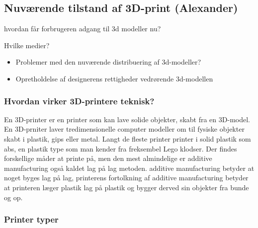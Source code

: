 \subsection{Nuværende tilstand af 3D-print (Alexander)} %
\label{sub:nuv_rende_tilstand_af_3d_print_alexander_}

hvordan får forbrugeren adgang til 3d modeller nu?

Hvilke medier?

\begin{itemize}
	\item Problemer med den nuværende distribuering af 3d-modeller?
	\item Opretholdelse af designerens rettigheder vedrørende 3d-modellen
\end{itemize}



\subsubsection{Hvordan virker 3D-printere teknisk?}

En 3D-printer er en printer som kan lave solide objekter, skabt fra en 3D-model. En 3D-prniter laver tredimensionelle computer modeller om til  fysiske objekter skabt i plastik, gips eller metal. Langt de fleste printer printer i solid plastik som abs, en plastik type som man kender fra freksembel Lego klodser. Der findes forskellige måder at printe på, men den mest almindelige er additive manufacturing også kaldet lag på lag metoden. additive manufacturing betyder at noget byges lag på lag, printerens fortolkning af additive manufacturing betyder at printeren læger plastik lag på plastik og bygger derved sin objekter fra bunde og op. 

\subsubsection{Printer typer}

